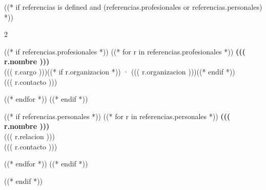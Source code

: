 \documentclass[10pt,a4paper,ragged2e,withhyper]{altacv}
\begin{document}
((* if referencias is defined and (referencias.profesionales or referencias.personales) *))
\begin{paracol}{2}
\vspace*{0pt}

((* if referencias.profesionales *))
((* for r in referencias.profesionales *))
\textbf{((( r.nombre )))}\\
((( r.cargo )))((* if r.organizacion *)) · ((( r.organizacion )))((* endif *))\\
{\small ((( r.contacto )))}

\smallskip
((* endfor *))
((* endif *))

\switchcolumn
\vspace*{0pt}

((* if referencias.personales *))
((* for r in referencias.personales *))
\textbf{((( r.nombre )))}\\
((( r.relacion )))\\
{\small ((( r.contacto )))}

\smallskip
((* endfor *))
((* endif *))

\end{paracol}
((* endif *))
\end{document}
